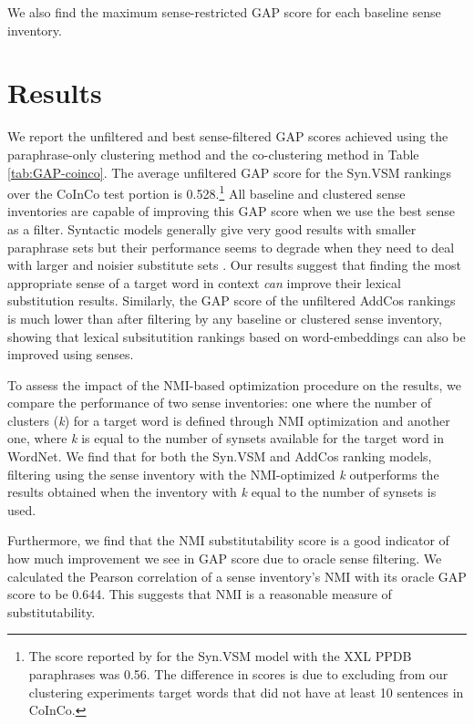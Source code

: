 \documentclass[11pt]{article}
\begin{document}
\noindent We also find the maximum sense-restricted GAP score for each baseline sense inventory.


\section{Results}

We report the unfiltered and best sense-filtered GAP scores achieved using the paraphrase-only clustering method %
and the co-clustering method in Table \ref{tab:GAP-coinco}. 
The average unfiltered GAP score for the Syn.VSM rankings over the CoInCo test portion is 0.528.\footnote{The score reported by  for the Syn.VSM model with the XXL PPDB paraphrases was 0.56. The difference in scores is due to excluding from our clustering experiments target words that did not have at least 10 sentences in CoInCo.}  All baseline and clustered sense inventories are capable of improving this GAP score when we use the best sense as a filter. Syntactic models generally give very good results with smaller paraphrase sets \cite{kremer-EtAl:2014:EACL} but their performance seems to degrade when they need to deal with larger and noisier substitute sets \cite{apidianaki:2016:EMNLP2016}. Our results suggest that finding the most appropriate sense of a target word in context \textit{can} improve their lexical substitution results. Similarly, the GAP score of the unfiltered AddCos rankings is much lower than after filtering by any baseline or clustered sense inventory, showing that lexical subsitutition rankings based on word-embeddings can also be improved using senses. 

To assess the impact of the NMI-based optimization procedure on the results, we compare the performance of two sense inventories: one where the number of clusters (\textit{k}) for a target word is defined through NMI optimization  and another one, where \textit{k} is equal to the number of synsets available for the target word in WordNet. We find that for both the Syn.VSM and AddCos ranking models, filtering using the sense inventory with the NMI-optimized \textit{k} outperforms the results obtained when the inventory with \textit{k} equal to the number of  synsets is used. 

Furthermore, we find that the NMI substitutability score is a good indicator of how much improvement we see in GAP score due to oracle sense filtering. We calculated the Pearson correlation of a sense inventory's NMI with its oracle GAP score to be 0.644. This suggests that NMI is a reasonable measure of substitutability.
\end{document}
